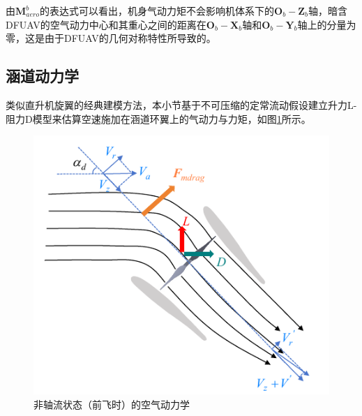 由$\boldsymbol{M}_{aero}^b$的表达式可以看出，机身气动力矩不会影响机体系下的${\boldsymbol{O}_b}-{\boldsymbol{Z}_b}$轴，暗含DFUAV的空气动力中心和其重心之间的距离在${\boldsymbol{O}_b}-{\boldsymbol{X}_b}$轴和${\boldsymbol{O}_b}-{\boldsymbol{Y}_b}$轴上的分量为零，这是由于DFUAV的几何对称特性所导致的。

\subsection{涵道动力学}

类似直升机旋翼的经典建模方法，本小节基于不可压缩的定常流动假设建立升力L-阻力D模型来估算空速施加在涵道环翼上的气动力与力矩\cite{johnsonModelingControlFlight2006b}，如图\ref{非轴流状态}所示。

\begin{figure}[htbp]
	\centering
	\begin{minipage}[c]{1\textwidth}
		\centering
		\includegraphics[scale=1]{Fig/非轴流状态.pdf}
		\caption{\label{非轴流状态}非轴流状态（前飞时）的空气动力学}
	\end{minipage}%
\end{figure}

